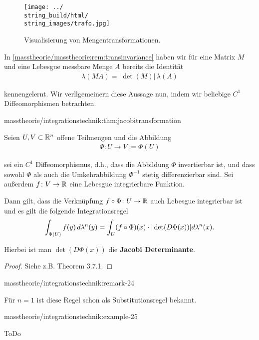 \begin{figure}[htbp]
\centering


\noindent\texttt{[image: ../\\string\_build/html/\\string\_images/trafo.jpg]}
\caption{Visualisierung von Mengentransformationen.}\label{\detokenize{masstheorie/integrationstechnik:fig-trafo}}\end{figure}

\par
In \cref{masstheorie/masstheorie:rem:transinvariance} haben wir für eine Matrix \(M\) und eine Lebesgue messbare Menge \(A\) bereits die Identität
\begin{align*}
\lambda(MA) = |\det(M)| \, \lambda(A)
\end{align*}
\par
kennengelernt. Wir verllgemeinern diese Aussage nun, indem wir beliebige \(C^1\) Diffeomorphismen betrachten.
\begin{theorem}{}{masstheorie/integrationstechnik:thm:jacobitransformation}



\par
Seien \(U, V \subset \mathbb{R}^n\) offene Teilmengen und die Abbildung
\begin{align*}
\Phi \colon U \rightarrow V := \Phi(U)
\end{align*}
\par
sei ein \(C^1\) Diffeomorphismus, d.h., dass die Abbildung \(\Phi\) invertierbar ist, und dass sowohl \(\Phi\) als auch die Umkehrabbildung \(\Phi^{-1}\) stetig differenzierbar sind.
Sei außerdem \(f \colon V \rightarrow \mathbb{R}\) eine Lebesgue integrierbare Funktion.

\par
Dann gilt, dass die Verknüpfung \(f \circ \Phi \colon U \rightarrow \mathbb{R}\) auch Lebesgue integrierbar ist und es gilt die folgende Integrationsregel
\begin{align*}
\int_{\Phi(U)} f(y)\,d\lambda^n(y) = \int_U (f \circ \Phi)(x) \cdot \vert \det(D\Phi(x)) \vert d\lambda^n(x).\end{align*}
\par
Hierbei ist man \(\det(D\Phi(x))\) die \textbf{Jacobi Determinante}.
\end{theorem}

\begin{proof}
 Siehe z.B. \cite{Bog07} Theorem 3.7.1.
\end{proof}
\begin{remark}{}{masstheorie/integrationstechnik:remark-24}



\par
Für \(n=1\) ist diese Regel schon als Substitutionsregel bekannt.
\end{remark}
\begin{example}{}{masstheorie/integrationstechnik:example-25}



\par
ToDo
\end{example}


